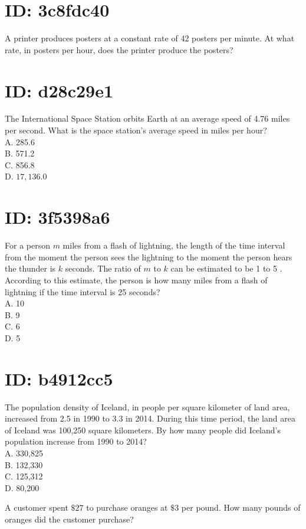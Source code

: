 

\section*{ID: 3c8fdc40}
A printer produces posters at a constant rate of 42 posters per minute. At what rate, in posters per hour, does the printer produce the posters?

\section*{ID: d28c29e1}
The International Space Station orbits Earth at an average speed of 4.76 miles per second. What is the space station's average speed in miles per hour?\\
A. 285.6\\
B. 571.2\\
C. 856.8\\
D. $17,136.0$

\section*{ID: 3f5398a6}
For a person $m$ miles from a flash of lightning, the length of the time interval from the moment the person sees the lightning to the moment the person hears the thunder is $k$ seconds. The ratio of $m$ to $k$ can be estimated to be 1 to 5 . According to this estimate, the person is how many miles from a flash of lightning if the time interval is 25 seconds?\\
A. 10\\
B. 9\\
C. 6\\
D. 5

\section*{ID: b4912cc5}
The population density of Iceland, in people per square kilometer of land area, increased from 2.5 in 1990 to 3.3 in 2014. During this time period, the land area of Iceland was 100,250 square kilometers. By how many people did Iceland's population increase from 1990 to 2014?\\
A. 330,825\\
B. 132,330\\
C. 125,312\\
D. 80,200

A customer spent $\$ 27$ to purchase oranges at $\$ 3$ per pound. How many pounds of oranges did the customer purchase?

